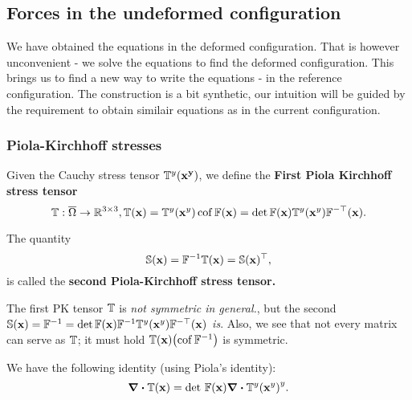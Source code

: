 \documentclass[reqno, a4paper]{article}
\begin{document}
\subsection{Forces in the undeformed configuration}
\label{sec:forces_undeformed}

We have obtained the equations in the deformed configuration. That is however unconvenient - we solve the equations to find the deformed configuration. This brings us to find a new way to write the equations - in the reference configuration. The construction is a bit synthetic, our intuition will be guided by the requirement to obtain similair equations as in the current configuration.

\subsubsection{Piola-Kirchhoff stresses}
\label{sec:pkstresses}

\begin{definition}
Given the Cauchy stress tensor $\mathbb{T}^y(\vb{x^y})$, we define the \textbf{First Piola Kirchhoff stress tensor}
\[
	\mathbb{T}: \overline{\Omega} \to {\mathbb R}^{3 \times 3}, \mathbb{T}(\vb{x}) = \mathbb{T}^y(\vb{x}^y) \operatorname{cof} \mathbb{F} (\vb{x}) = \det \mathbb{F} (\vb{x}) \mathbb{T}^y(\vb{x}^y) \mathbb{F}^{-\top}(\vb{x}).
\]
\end{definition}

\begin{definition}
The quantity
	\[
		\mathbb{S}(\vb{x}) = \mathbb{F}^{-1} \mathbb{T}(\vb{x}) = \mathbb{S}(\vb{x})^\top,
	\]
	is called the \textbf{second Piola-Kirchhoff stress tensor.}
\end{definition}

\begin{remark}
	The first PK tensor $\mathbb{T}$ is \textit{not symmetric in general.}, but the second $\mathbb{S}(\vb{x}) = \mathbb{F}^{-1} = \det \mathbb{F} (\vb{x}) \mathbb{F}^{-1} \mathbb{T}^y(\vb{x}^y) \mathbb{F}^{-\top}(\vb{x})$ \textit{is}. Also, we see that not every matrix can serve as $\mathbb{T}$; it must hold $\mathbb{T}\qty(\vb{x}) \qty(\operatorname{cof} \mathbb{F}^{-1})$ is symmetric.
\end{remark}

\begin{remark}
We have the following identity (using Piola's identity):
\begin{equation}
	\divergence{\pkstress} \qty(\vb{x}) = \detf \qty(\vb{x}) \divergence{\cstress}\qty(\vb{x}^{y})^{y}.
\end{equation}
\end{remark}
\end{document}

